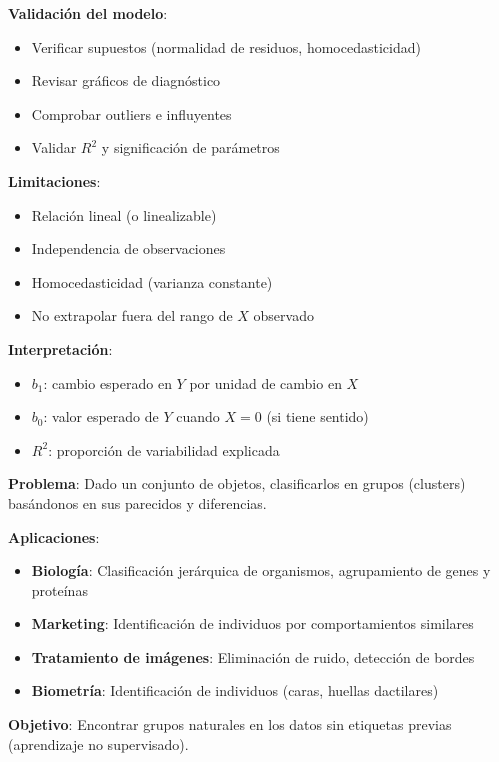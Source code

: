 \documentclass[10pt,a4paper]{article}
\begin{document}
\begin{tcolorbox}[title=Consideraciones Importantes]
    \textbf{Validación del modelo}:
    \begin{itemize}
        \item Verificar supuestos (normalidad de residuos, homocedasticidad)
        \item Revisar gráficos de diagnóstico
        \item Comprobar outliers e influyentes
        \item Validar $R^2$ y significación de parámetros
    \end{itemize}
    
    \textbf{Limitaciones}:
    \begin{itemize}
        \item Relación lineal (o linealizable)
        \item Independencia de observaciones
        \item Homocedasticidad (varianza constante)
        \item No extrapolar fuera del rango de $X$ observado
    \end{itemize}
    
    \textbf{Interpretación}:
    \begin{itemize}
        \item $b_1$: cambio esperado en $Y$ por unidad de cambio en $X$
        \item $b_0$: valor esperado de $Y$ cuando $X = 0$ (si tiene sentido)
        \item $R^2$: proporción de variabilidad explicada
    \end{itemize}
\end{tcolorbox}

\pagebreak


\begin{tcolorbox}[title=Introducción al Clustering]
    \textbf{Problema}: Dado un conjunto de objetos, clasificarlos en grupos (clusters) basándonos en sus parecidos y diferencias.
    
    \textbf{Aplicaciones}:
    \begin{itemize}
        \item \textbf{Biología}: Clasificación jerárquica de organismos, agrupamiento de genes y proteínas
        \item \textbf{Marketing}: Identificación de individuos por comportamientos similares
        \item \textbf{Tratamiento de imágenes}: Eliminación de ruido, detección de bordes
        \item \textbf{Biometría}: Identificación de individuos (caras, huellas dactilares)
    \end{itemize}
    
    \textbf{Objetivo}: Encontrar grupos naturales en los datos sin etiquetas previas (aprendizaje no supervisado).
\end{tcolorbox}
\end{document}
